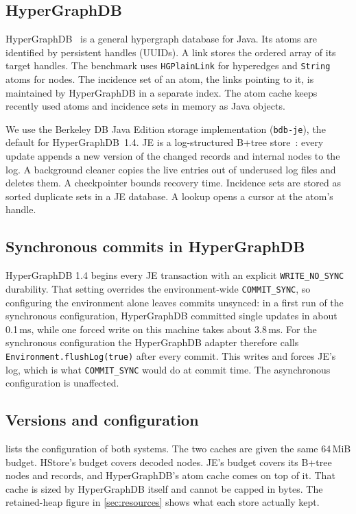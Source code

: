 \subsection{HyperGraphDB}

HyperGraphDB~\cite{hgdb} is a general hypergraph database for Java. Its atoms are identified by persistent handles (UUIDs). A link stores the ordered array of its target handles. The benchmark uses \texttt{HGPlainLink} for hyperedges and \texttt{String} atoms for nodes. The incidence set of an atom, the links pointing to it, is maintained by HyperGraphDB in a separate index. The atom cache keeps recently used atoms and incidence sets in memory as Java objects.

We use the Berkeley DB Java Edition storage implementation (\texttt{bdb-je}), the default for HyperGraphDB~1.4. JE is a log-structured B+tree store~\cite{je,lfs}: every update appends a new version of the changed records and internal nodes to the log. A background cleaner copies the live entries out of underused log files and deletes them. A checkpointer bounds recovery time. Incidence sets are stored as sorted duplicate sets in a JE database. A lookup opens a cursor at the atom's handle.

\subsection{Synchronous commits in HyperGraphDB}
\label{sec:durability}

HyperGraphDB 1.4 begins every JE transaction with an explicit \texttt{WRITE\_NO\_SYNC} durability. That setting overrides the environment-wide \texttt{COMMIT\_SYNC}, so configuring the environment alone leaves commits unsynced: in a first run of the synchronous configuration, HyperGraphDB committed single updates in about 0.1\,ms, while one forced write on this machine takes about 3.8\,ms. For the synchronous configuration the HyperGraphDB adapter therefore calls \texttt{Environment.flushLog(true)} after every commit. This writes and forces JE's log, which is what \texttt{COMMIT\_SYNC} would do at commit time. The asynchronous configuration is unaffected.

\subsection{Versions and configuration}

 lists the configuration of both systems. The two caches are given the same 64\,MiB budget. HStore's budget covers decoded nodes. JE's budget covers its B+tree nodes and records, and HyperGraphDB's atom cache comes on top of it. That cache is sized by HyperGraphDB itself and cannot be capped in bytes. The retained-heap figure in \cref{sec:resources} shows what each store actually kept.


